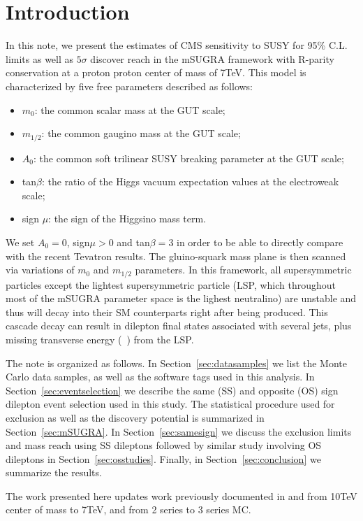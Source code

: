 \section{Introduction}
\label{sec:intro}

In this note, we present the estimates of CMS sensitivity to SUSY for 95\% C.L. limits as well as $5\sigma$ discover reach
in the mSUGRA framework with R-parity conservation at a proton proton center of mass of 7TeV. This model is characterized by five
free parameters described as follows:

\begin{itemize}
\item $m_{0}$: the common scalar mass at the GUT scale;
\item $m_{1/2}$: the common gaugino mass at the GUT scale;
\item $A_{0}$: the common soft trilinear SUSY breaking parameter at the GUT scale;
\item tan$\beta$: the ratio of the Higgs vacuum expectation values at the electroweak scale;
\item sign $\mu$: the sign of the Higgsino mass term.
\end{itemize}

 We set $A_{0} = 0$, sign$\mu > 0$ and tan$\beta = 3$ in order to be able to directly
compare with the recent Tevatron results\cite{cdf}\cite{dzero}. The gluino-squark mass plane is then scanned 
via variations of $m_{0}$ and $m_{1/2}$ parameters. In this framework, all supersymmetric particles
except the lightest supersymmetric particle (LSP, which throughout most of the mSUGRA parameter space is
the lighest neutralino) are unstable and thus will decay into their SM counterparts right
after being produced. This cascade decay can result in dilepton final states associated 
with several jets, plus missing transverse energy (\met~) from the LSP.

The note is organized as follows. In Section~\ref{sec:datasamples} we list the Monte Carlo data samples, as well as the 
software tags used in this analysis. In Section~\ref{sec:eventselection} we describe the same (SS) and opposite (OS) sign 
dilepton event selection used in this study. The statistical procedure used for exclusion as well as 
the discovery potential is summarized in Section~\ref{sec:mSUGRA}. In Section~\ref{sec:samesign} we discuss the exclusion limits and
mass reach using SS dileptons followed by similar study involving OS dileptons in Section~\ref{sec:osstudies}. Finally, in 
Section~\ref{sec:conclusion} we summarize the results.

The work presented here updates work previously documented in\cite{osnote} and \cite{ssnote} from 10TeV center of mass to 7TeV,
and from 2 series to 3 series MC.
 
 



